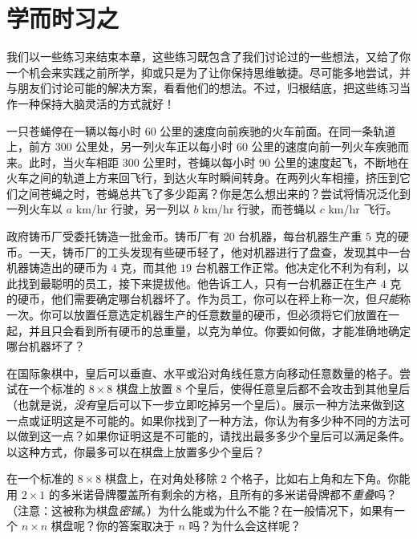 \section{学而时习之}\label{sec:section1.5}

我们以一些练习来结束本章，这些练习既包含了我们讨论过的一些想法，又给了你一个机会来实践之前所学，抑或只是为了让你保持思维敏捷。尽可能多地尝试，并与朋友们讨论可能的解决方案，看看他们的想法。不过，归根结底，把这些练习当作一种保持大脑灵活的方式就好！

\begin{exercise}
    一只苍蝇停在一辆以每小时 $60$ 公里的速度向前疾驰的火车前面。在同一条轨道上，前方 $300$ 公里处，另一列火车正以每小时 $60$ 公里的速度向前一列火车疾驰而来。此时，当火车相距 $300$ 公里时，苍蝇以每小时 $90$ 公里的速度起飞，不断地在火车之间的轨道上方来回飞行，到达火车时瞬间转身。在两列火车相撞，挤压到它们之间苍蝇之时，苍蝇总共飞了多少距离？你是怎么想出来的？尝试将情况泛化到一列火车以 $a$ km/hr 行驶，另一列以 $b$ km/hr 行驶，而苍蝇以 $c$ km/hr 飞行。
\end{exercise}

\begin{exercise}
    政府铸币厂受委托铸造一批金币。铸币厂有 $20$ 台机器，每台机器生产重 $5$ 克的硬币。一天，铸币厂的工头发现有些硬币轻了，他对机器进行了盘查，发现其中一台机器铸造出的硬币为 $4$ 克，而其他 $19$ 台机器工作正常。他决定化不利为有利，以此找到最聪明的员工，接下来提拔他。他告诉工人，只有一台机器正在生产 $4$ 克的硬币，他们需要确定哪台机器坏了。作为员工，你可以在秤上称一次，但\emph{只能}称一次。你可以放置任意选定机器生产的任意数量的硬币，但必须将它们放置在一起，并且只会看到所有硬币的总重量，以克为单位。你要如何做，才能准确地确定哪台机器坏了？
\end{exercise}

\begin{exercise}
    在国际象棋中，皇后可以垂直、水平或沿对角线任意方向移动任意数量的格子。尝试在一个标准的 $8 \times 8$ 棋盘上放置 $8$ 个皇后，使得任意皇后都不会攻击到其他皇后（也就是说，\emph{没有}皇后可以下一步立即吃掉另一个皇后）。展示一种方法来做到这一点或证明这是不可能的。如果你找到了一种方法，你认为有多少种不同的方法可以做到这一点？如果你证明这是不可能的，请找出最多多少个皇后可以满足条件。以这种方式，你最多可以在棋盘上放置多少个皇后？
\end{exercise}

\begin{exercise}
    在一个标准的 $8 \times 8$ 棋盘上，在对角处移除 $2$ 个格子，比如右上角和左下角。你能用 $2 \times 1$ 的多米诺骨牌覆盖所有剩余的方格，且所有的多米诺骨牌都不\emph{重叠}吗？（注意：这被称为棋盘\emph{密铺}。）为什么能或为什么不能？在一般情况下，如果有一个 $n \times n$ 棋盘呢？你的答案取决于 $n$ 吗？为什么会这样呢？
\end{exercise}


